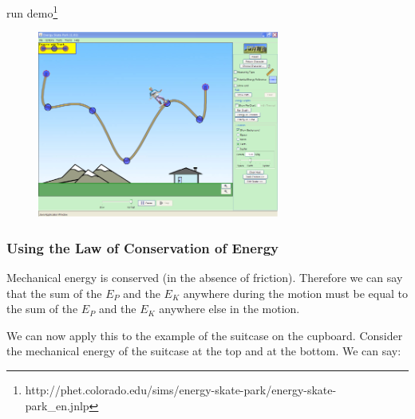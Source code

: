 run demo\footnote{http://phet.colorado.edu/sims/energy-skate-park/energy-skate-park\_en.jnlp}
        

    \setcounter{subfigure}{0}


	\begin{figure}[H] %
    \begin{center}
    \label{m38786*id634528!!!underscore!!!media}\label{m38786*id634528!!!underscore!!!printimage}\includegraphics{col11305.imgs/m38786_energy-skate-park-screenshot.png} %
        
      \vspace{2pt}
    \vspace{.1in}
    
    \end{center}

 \end{figure}   

    \addtocounter{footnote}{-0}
    \par 
      
      \label{m38786*uid79}
            \subsubsection{ Using the Law of Conservation of Energy}
            \nopagebreak
            
        
        \label{m38786*id68660}Mechanical energy is conserved (in the absence of friction). Therefore we can say that the sum of the \begin{math}{E}_{P}\end{math} and the \begin{math}{E}_{K}\end{math} anywhere during the motion must be equal to the sum of the \begin{math}{E}_{P}\end{math} and the \begin{math}{E}_{K}\end{math} anywhere else in the motion.\par 
        \label{m38786*id68713}We can now apply this to the example of the suitcase on the cupboard. Consider the mechanical energy of the suitcase at the top and at the bottom. We can say:\par 
        \label{m38786*id68720}
          
